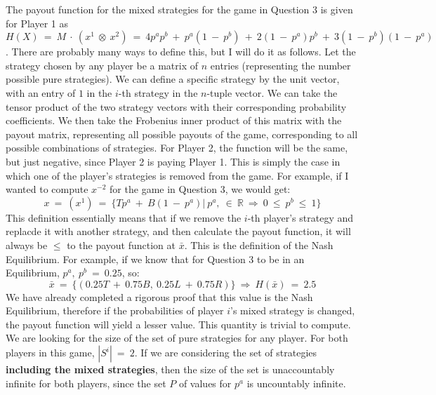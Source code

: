 \documentclass{article}
\begin{document}
\newline\newline
The payout function for the mixed strategies for the game in Question 3 is given for Player 1 as $H(X) \ = \ M \ \cdot \ (x^1 \ \otimes \ x^2) \ = \ 4p^ap^b \ + \ p^a(1 \ - \ p^b) \ + \ 2(1 \ - \ p^a)p^b \ + \ 3(1 \ - \ p^b)(1 \ - \ p^a)$. There are probably many ways to define this, but I will do it as follows. Let the strategy chosen by any player be a matrix of $n$ entries (representing the number possible pure strategies). We can define a specific strategy by the unit vector, with an entry of $1$ in the $i$-th strategy in the $n$-tuple vector. We can take the tensor product of the two strategy vectors with their corresponding probability coefficients. We then take the Frobenius inner product of this matrix with the payout matrix, representing all possible payouts of the game, corresponding to all possible combinations of strategies. For Player 2, the function will be the same, but just negative, since Player 2 is paying Player 1.
\newline\newline
This is simply the case in which one of the player's strategies is removed from the game. For example, if I wanted to compute $x^{-2}$ for the game in Question 3, we would get:
$$x \ = \ (x^1) \ = \ \{Tp^a \ + \ B(1 \ - \ p^a) | \ p^a, \ \in \ \mathbb{R} \ \Rightarrow \ 0 \ \leq \ p^b \ \leq \ 1\}$$
\newline\newline
This definition essentially means that if we remove the $i$-th player's strategy and replacde it with another strategy, and then calculate the payout function, it will always be $\leq$ to the payout function at $\bar{x}$. This is the definition of the Nash Equilibrium. For example, if we know that for Question 3 to be in an Equilibrium, $p^a, \ p^b \ = \ 0.25$, so:
$$\bar{x} \ = \ \{(0.25T \ + \ 0.75B, \ 0.25L \ + \ 0.75R)\} \ \Rightarrow \ H(\bar{x}) \ = \ 2.5$$
We have already completed a rigorous proof that this value is the Nash Equilibrium, therefore if the probabilities of player $i$'s mixed strategy is changed, the payout function will yield a lesser value.
\newline\newline
This quantity is trivial to compute. We are looking for the size of the set of pure strategies for any player. For both players in this game, $|S^i| \ = \ 2$. If we are considering the set of strategies \textbf{including the mixed strategies}, then the size of the set is unaccountably infinite for both players, since the set $P$ of values for $p^a$ is uncountably infinite.
\end{document}
